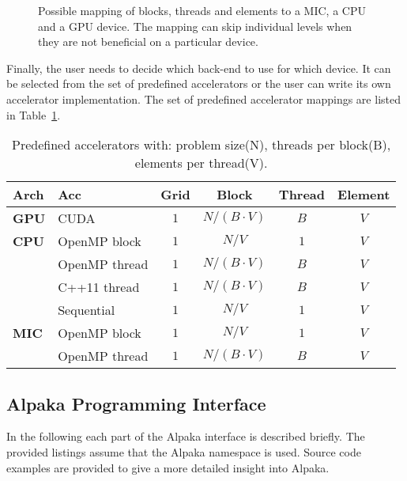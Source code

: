 \documentclass[10pt, twocolumn]{article}
\newcommand{\alpaka}{Alpaka\xspace}
\newcommand{\cuda}{{CUDA}\xspace}
\newcommand{\openmp}{{OpenMP}\xspace}
\begin{document}
\begin{figure}[th]
  \centerline
      {}
      \caption{Possible mapping of blocks, threads and elements to a MIC, a CPU and a GPU device. The mapping can skip individual levels when they are not beneficial on a particular device.}
      \label{fig:mapping}
      \vspace{-0.5em}
\end{figure}

\noindent Finally, the user needs to decide which back-end to use for which device.
It can be selected from the set of predefined accelerators or the user can write its own accelerator implementation.
The set of predefined accelerator mappings are listed in Table~\ref{tab:accelerators}.
\begin{table}[!htbp]
  \scriptsize
\caption{Predefined accelerators with: problem size(N), threads per block(B), elements per thread(V).}
  \begin{center}
    \begin{tabular}{ | l | l | c | c | c | c |}
      \hline
      Arch & Acc & Grid & Block & Thread & Element\\
      \hline
      \hline
      \textbf{GPU} & \cuda & $1$ & $N/(B \cdot V)$ & $B$ & $V$\\
\hline
      \textbf{CPU} & \openmp block & $1$ & $N/V$ & $1$ & $V$\\
      & \openmp thread & $1$ & $N/(B \cdot V)$ & $B$ & $V$\\
      & C++11 thread & $1$ & $N/(B \cdot V)$ & $B$ & $V$\\
& Sequential & $1$ & $N/V$ & $1$ & $V$\\
\hline
      \textbf{MIC} & \openmp block & $1$ & $N/V$ & $1$ & $V$\\
      & \openmp thread & $1$ & $N/(B \cdot V)$ & $B$ & $V$\\
      \hline
    \end{tabular}

  \end{center}
  \label{tab:accelerators}
\end{table}











\subsection{Alpaka Programming Interface}
\label{subsec:interface}
In the following each part of the \alpaka interface is described briefly.
The provided listings assume that the \alpaka namespace is used.
Source code examples are provided to give a more detailed insight into \alpaka.
\end{document}
